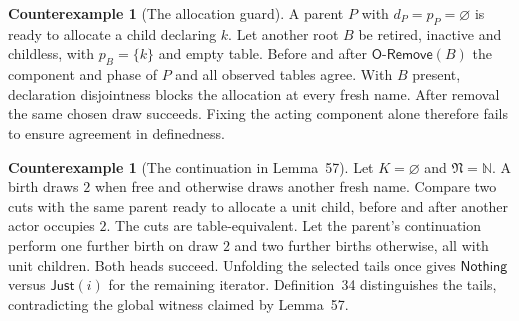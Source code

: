 \documentclass[11pt,a4paper]{article}
\theoremstyle{definition}
\newtheorem{counterexample}[definition]{Counterexample}
\theoremstyle{plain}
\newcommand{\N}{\mathfrak{N}}
\newcommand{\Just}{\mathsf{Just}}
\newcommand{\Nothing}{\mathsf{Nothing}}
\newcommand{\ORemove}{\mathsf{O\text{-}Remove}}
\begin{document}
\begin{counterexample}[The allocation guard]
A parent $P$ with $d_P=p_P=\varnothing$ is ready to allocate a child declaring $k$. Let another root $B$ be retired, inactive and childless, with $p_B=\{k\}$ and empty table. Before and after $\ORemove(B)$ the component and phase of $P$ and all observed tables agree. With $B$ present, declaration disjointness blocks the allocation at every fresh name. After removal the same chosen draw succeeds. Fixing the acting component alone therefore fails to ensure agreement in definedness.
\end{counterexample}

\begin{counterexample}[The continuation in Lemma~57]
\label{ex:draw}
Let $K=\varnothing$ and $\N=\mathbb N$. A birth draws $2$ when free and otherwise draws another fresh name. Compare two cuts with the same parent ready to allocate a unit child, before and after another actor occupies $2$. The cuts are table-equivalent. Let the parent's continuation perform one further birth on draw $2$ and two further births otherwise, all with unit children. Both heads succeed. Unfolding the selected tails once gives $\Nothing$ versus $\Just(i)$ for the remaining iterator. Definition~34 distinguishes the tails, contradicting the global witness claimed by Lemma~57.
\end{counterexample}
\end{document}
